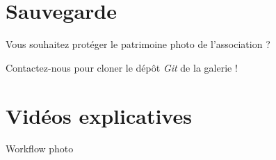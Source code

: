 \documentclass[12pt,nofoldmark,notumble]{leaflet}
\begin{document}
\section{\faSave Sauvegarde}

Vous souhaitez protéger le patrimoine photo de l'association ?

Contactez-nous pour cloner le dépôt \emph{Git} de la galerie !
\vspace*{\fill}
\section{\faYoutube Vidéos explicatives}


\begin{center}
  \setlength{\fboxsep}{0pt}%
  \setlength{\fboxrule}{0pt}%
 \end{center} 

\clearpage

\begin{center}
  \setlength{\fboxsep}{0pt}%
  \setlength{\fboxrule}{0pt}%

  Workflow photo
\end{center}
\end{document}
